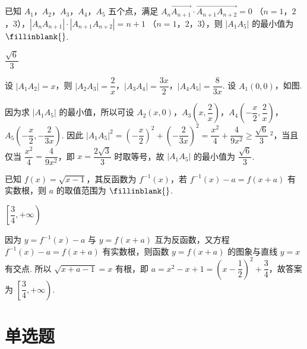 \begin{problem}
已知 \(A_1\)，\(A_2\)，\(A_3\)，\(A_4\)，\(A_5\) 五个点，满足 \(\overrightarrow{A_nA_{n+1}}\cdot\overrightarrow{A_{n+1}A_{n+2}}=0\) （\(n=1\)，\(2\)，\(3\)），\(|A_nA_{n+1}|\cdot|A_{n+1}A_{n+2}|=n+1\) （\(n=1\)，\(2\)，\(3\)），则 \(|A_1A_5|\) 的最小值为 \(\fillinblank{}\).
\end{problem}

\begin{answer}
\(\dfrac{\sqrt{6}}{3}\)
\end{answer}

\begin{solution}
设 \(|A_1A_2|=x\)，则 \(|A_2A_3|=\dfrac{2}{x}\)，\(|A_3A_4|=\dfrac{3x}{2}\)，\(|A_4A_5|=\dfrac{8}{3x}\). 设 \(A_1(0,0)\)，如图.


因为求 \(|A_1A_5|\) 的最小值，所以可设 \(A_2(x,0)\)，\(A_3\left(x,\dfrac{2}{x}\right)\)，\(A_4\left(-\dfrac{x}{2},\dfrac{2}{x}\right)\)，\(A_5\left(-\dfrac{x}{2},-\dfrac{2}{3x}\right)\). 因此 \(|A_1A_5|^2=\left(-\dfrac{x}{2}\right)^2+\left(-\dfrac{2}{3x}\right)^2=\dfrac{x^2}{4}+\dfrac{4}{9x^2}\geq\dfrac{\sqrt{6}}{3}\,^2\)，当且仅当 \(\dfrac{x^2}{4}=\dfrac{4}{9x^2}\)，即 \(x=\dfrac{2\sqrt{3}}{3}\) 时取等号，故 \(|A_1A_5|\) 的最小值为 \(\dfrac{\sqrt{6}}{3}\).
\end{solution}

\begin{problem}
已知 \(f(x)=\sqrt{x-1}\)，其反函数为 \(f^{-1}(x)\)，若 \(f^{-1}(x)-a=f(x+a)\) 有实数根，则 \(a\) 的取值范围为 \(\fillinblank{}\).
\end{problem}

\begin{answer}
\(\left[\dfrac{3}{4},+\infty\right)\)
\end{answer}

\begin{solution}
因为 \(y=f^{-1}(x)-a\) 与 \(y=f(x+a)\) 互为反函数，又方程 \(f^{-1}(x)-a=f(x+a)\) 有实数根，则函数 \(y=f(x+a)\) 的图象与直线 \(y=x\) 有交点. 所以 \(\sqrt{x+a-1}=x\) 有根，即 \(a=x^2-x+1=\left(x-\dfrac{1}{2}\right)^2+\dfrac{3}{4}\)，故答案为 \(\left[\dfrac{3}{4},+\infty\right)\).

\end{solution}

\section{单选题}

